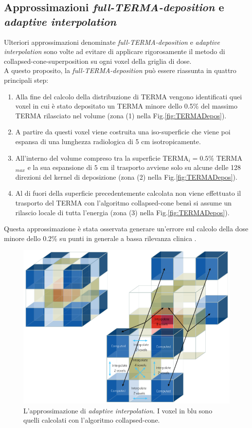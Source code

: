 {\subsection{Approssimazioni \textit{full-TERMA-deposition} e \textit{adaptive interpolation}}
Ulteriori approssimazioni denominate \textit{full-TERMA-deposition} e \textit{adaptive interpolation} sono volte ad evitare di applicare rigorosamente il metodo di collapsed-cone-superposition su ogni voxel della griglia di dose.\\
A questo proposito, la \textit{full-TERMA-deposition} può essere riassunta in quattro principali step:
\begin{enumerate}
\item Alla fine del calcolo della distribuzione di TERMA vengono identificati quei voxel in cui è stato depositato un TERMA minore dello 0.5\% del massimo TERMA rilasciato nel volume (zona (1) nella Fig.\ref{fig:TERMADepos}).
\item A partire da questi voxel viene costruita una iso-superficie che viene poi espansa di una lunghezza radiologica di 5 cm isotropicamente.
\item All'interno del volume compreso tra la superficie TERMA$_i= 0.5\%$ TERMA$_{max}$ e la sua espansione di $5$ cm  il trasporto avviene solo su alcune delle 128 direzioni del kernel di deposizione (zona (2) nella Fig.\ref{fig:TERMADepos}). 
\item Al di fuori della superficie precedentemente calcolata non viene effettuato il trasporto del TERMA con l'algoritmo collapsed-cone bensì si assume un rilascio locale di tutta l'energia (zona (3) nella Fig.\ref{fig:TERMADepos}).
\end{enumerate}
Questa approssimazione è stata osservata generare un'errore sul calcolo della dose minore dello 0.2\% su punti in generale a bassa rilevanza clinica \cite{RaySearchLaboratories2014}.\\

\begin{figure}[!t]
\centering
\includegraphics[width=.8\textwidth]{./cap1/dose_interp.png}
\caption{L'approssimazione di \textit{adaptive interpolation}. I voxel in blu sono quelli calcolati con l'algoritmo collapsed-cone.}
\label{fig:dose_interp}
\end{figure}

}
